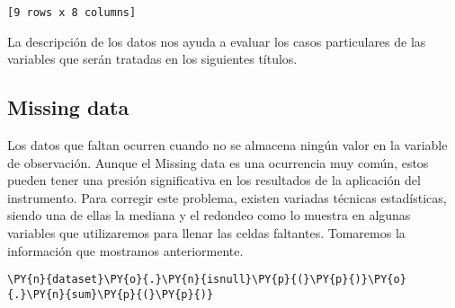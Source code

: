\begin{Verbatim}[commandchars=\\\{\}]
[9 rows x 8 columns]
    \end{Verbatim}

    La descripción de los datos nos ayuda a evaluar los casos particulares de las variables que serán tratadas en los siguientes títulos.

    \hypertarget{missing-data}{%
\subsection{Missing data}\label{missing-data}}

Los datos que faltan ocurren cuando no se almacena ningún valor en la variable de observación. Aunque el Missing data es una ocurrencia muy común, estos pueden tener una presión significativa en los resultados de la aplicación del instrumento. Para corregir este problema, existen variadas técnicas estadísticas, siendo una de ellas la mediana y el redondeo como lo muestra \cite{Bar2017} en algunas variables que utilizaremos para llenar las celdas faltantes. Tomaremos la información que mostramos anteriormente.

    \begin{tcolorbox}[breakable, size=fbox, boxrule=1pt, pad at break*=1mm,colback=cellbackground, colframe=cellborder]
\begin{Verbatim}[commandchars=\\\{\}]
\PY{n}{dataset}\PY{o}{.}\PY{n}{isnull}\PY{p}{(}\PY{p}{)}\PY{o}{.}\PY{n}{sum}\PY{p}{(}\PY{p}{)}
\end{Verbatim}
\end{tcolorbox}

\begin{table}[H]
\centering
\setlength{\tabcolsep}{5pt}
\caption{Missing data de variables}
\label{tab:missing data}
\end{table}
        
